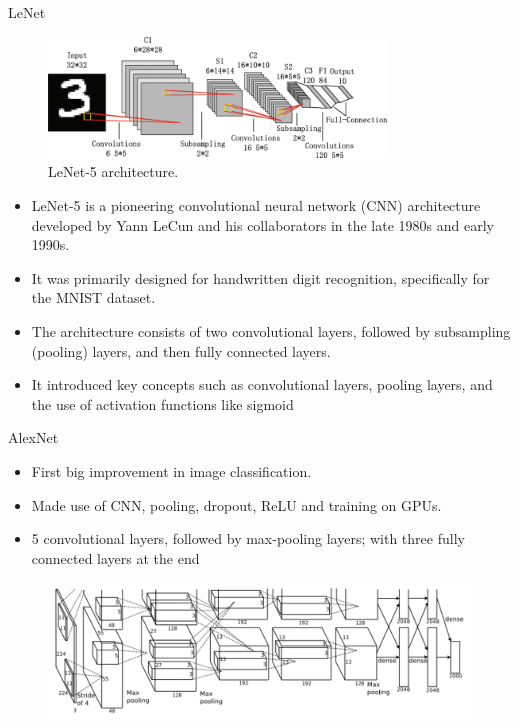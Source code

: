 \begin{frame}{LeNet}
\begin{figure}
\centering
\includegraphics[width=0.8\textwidth,height=0.4\textheight,keepaspectratio]{images/lenet5.png}
\caption{LeNet-5 architecture.}
\end{figure}
{\small
\begin{itemize}
    \item LeNet-5 is a pioneering convolutional neural network (CNN) architecture developed by Yann LeCun and his collaborators in the late 1980s and early 1990s.
    \item It was primarily designed for handwritten digit recognition, specifically for the MNIST dataset.
    \item The architecture consists of two convolutional layers, followed by subsampling (pooling) layers, and then fully connected layers.
    \item It introduced key concepts such as convolutional layers, pooling layers, and the use of activation functions like sigmoid
\end{itemize}
}
\end{frame}

\begin{frame}{AlexNet}
\begin{itemize}
    \item First big improvement in image classification.
    \item Made use of CNN, pooling, dropout, ReLU and training on GPUs.
    \item 5 convolutional layers, followed by max-pooling layers; with three fully connected layers at the end

\end{itemize}

\begin{figure}
\centering
\includegraphics[width=1.0\textwidth,height=0.5\textheight,keepaspectratio]{./images/alexnet.png}
\end{figure}
    
\end{frame}


